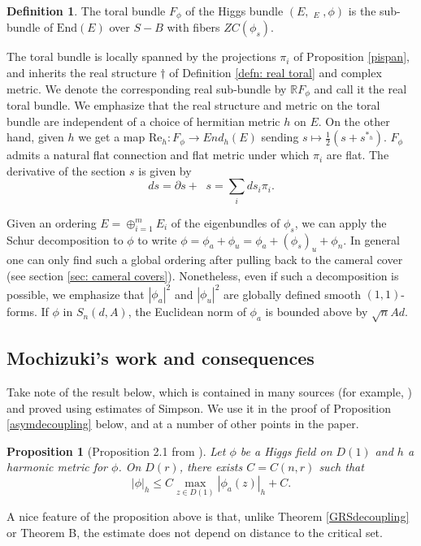 \documentclass[10pt]{amsart}
\newcommand{\R}{\mathbb R}
\DeclareMathOperator{\dbar}{\overline{\partial}}
\newtheorem{prop}[thm]{Proposition}
\theoremstyle{definition}
\newtheorem{defn}[thm]{Definition}
\begin{document}
\begin{defn}
    The toral bundle $F_\phi$ of the Higgs bundle $(E,\dbar_E,\phi)$ is the sub-bundle of $\mathrm{End}(E)$ over $S-B$ with fibers $ZC(\phi_s)$.
\end{defn}

The toral bundle is locally spanned by the projections $\pi_i$ of Proposition \ref{pispan}, and inherits the real structure $\dagger$ of Definition \ref{defn: real toral} and complex metric. We denote the corresponding real sub-bundle by $\R F_\phi$ and call it the real toral bundle. We emphasize that the real structure and metric on the toral bundle are independent of a choice of hermitian metric $h$ on $E$. On the other hand, given $h$ we get a map $\mathrm{Re}_h: F_\phi \to End_h(E)$ sending $s \mapsto \frac{1}{2}(s + s^{*_h}).$ $F_\phi$ admits a natural flat connection and flat metric under which $\pi_i$ are flat. The derivative of the section $s$ is given by
\[
ds = \partial s + \dbar s= \sum_i ds_i \pi_i.
\]

Given an ordering $E = \oplus_{i=1}^m E_i$ of the eigenbundles of $\phi_s$, we can apply the Schur decomposition to $\phi$ to write $\phi = \phi_a + \phi_u = \phi_a + (\phi_s)_u + \phi_n$. In general one can only find such a global ordering after pulling back to the cameral cover (see section \ref{sec: cameral covers}). Nonetheless, even if such a decomposition is possible, we emphasize that $|\phi_a|^2$ and $|\phi_u|^2$ are globally defined smooth $(1,1)$-forms. If $\phi$ in $S_n(d,A)$, the Euclidean norm of $\phi_a$ is bounded above by $\sqrt{n}Ad.$


\subsection{Mochizuki's work and consequences}
Take note of the result below, which is contained in many sources (for example, \cite{Mo}) and proved using estimates of Simpson. We use it in the proof of Proposition \ref{asymdecoupling} below, and at a number of other points in the paper.
\begin{prop}[Proposition 2.1 from \cite{Mo}]\label{firstbound} Let $\phi$ be a Higgs field on $D(1)$ and $h$ a harmonic metric for $\phi$. On $D(r)$, there exists $C=C(n,r)$ such that $$|\phi|_{h}\leq C\max_{z\in D(1)}|\phi_{a}(z)|_{h}+C.$$
\end{prop} 
A nice feature of the proposition above is that, unlike Theorem \ref{GRSdecoupling} or Theorem B, the estimate does not depend on distance to the critical set. 
\end{document}
